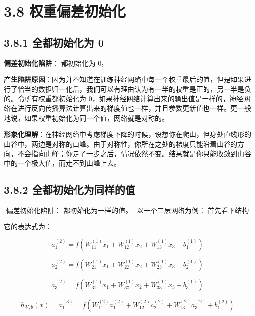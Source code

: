\section{3.8
权重偏差初始化}\label{ux6743ux91cdux504fux5deeux521dux59cbux5316}

\subsection{3.8.1 全都初始化为
0}\label{ux5168ux90fdux521dux59cbux5316ux4e3a-0}

\textbf{偏差初始化陷阱}： 都初始化为 0。

\textbf{产生陷阱原因}：因为并不知道在训练神经网络中每一个权重最后的值，但是如果进行了恰当的数据归一化后，我们可以有理由认为有一半的权重是正的，另一半是负的。令所有权重都初始化为
0，如果神经网络计算出来的输出值是一样的，神经网络在进行反向传播算法计算出来的梯度值也一样，并且参数更新值也一样。更一般地说，如果权重初始化为同一个值，网络就是对称的。

\textbf{形象化理解}：在神经网络中考虑梯度下降的时候，设想你在爬山，但身处直线形的山谷中，两边是对称的山峰。由于对称性，你所在之处的梯度只能沿着山谷的方向，不会指向山峰；你走了一步之后，情况依然不变。结果就是你只能收敛到山谷中的一个极大值，而走不到山峰上去。

\subsection{3.8.2
全都初始化为同样的值}\label{ux5168ux90fdux521dux59cbux5316ux4e3aux540cux6837ux7684ux503c}

​ 偏差初始化陷阱： 都初始化为一样的值。 ​ 以一个三层网络为例：
首先看下结构

 

它的表达式为：

\[
a_1^{(2)} = f(W_{11}^{(1)} x_1 + W_{12}^{(1)} x_2 + W_{13}^{(1)} x_3 + b_1^{(1)})
\]

\[
a_2^{(2)} = f(W_{21}^{(1)} x_1 + W_{22}^{(1)} x_2 + W_{23}^{(1)} x_3 + b_2^{(1)})
\]

\[
a_3^{(2)} = f(W_{31}^{(1)} x_1 + W_{32}^{(1)} x_2 + W_{33}^{(1)} x_3 + b_3^{(1)})
\]

\[
h_{W,b}(x) = a_1^{(3)} = f(W_{11}^{(2)} a_1^{(2)} + W_{12}^{(2)} a_2^{(2)} + W_{13}^{(2)} a_3^{(2)} + b_1^{(2)})
\]

